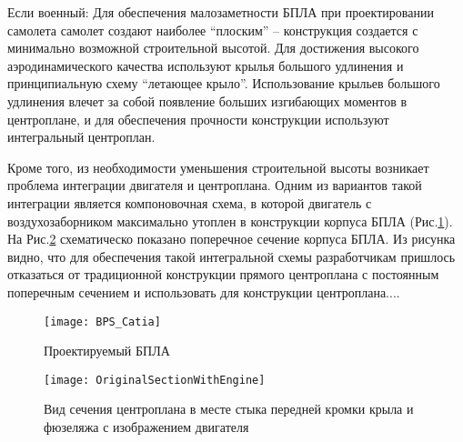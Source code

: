 


Если военный: Для обеспечения малозаметности БПЛА при проектировании самолета самолет создают наиболее ``плоским'' -- конструкция создается с минимально возможной строительной высотой. Для достижения высокого аэродинамического качества используют крылья большого удлинения и принципиальную схему ``летающее крыло''. Использование крыльев большого удлинения влечет за собой появление больших изгибающих моментов в центроплане, и для обеспечения прочности конструкции используют интегральный центроплан. 


Кроме того, из необходимости уменьшения строительной высоты возникает проблема интеграции двигателя и центроплана. Одним из вариантов такой интеграции является компоновочная схема, в которой двигатель с воздухозаборником максимально утоплен в конструкции корпуса БПЛА (Рис.\ref{fig:BPS}). На Рис.\ref{fig:OriginalSectionWithEngine} схематическо показано поперечное сечение корпуса БПЛА. Из рисунка видно, что для обеспечения такой интегральной схемы разработчикам пришлось отказаться от традиционной конструкции прямого центроплана с постоянным поперечным сечением и использовать для конструкции центроплана....



\begin{figure}[ht]
\centering
\texttt{[image: BPS\_Catia]}
\caption{Проектируемый БПЛА}
\label{fig:BPS}
\end{figure}




\begin{figure}[ht]
\captionsetup{justification=centering}
\centering
\texttt{[image: OriginalSectionWithEngine]}
\caption{Вид сечения центроплана в месте стыка передней кромки крыла и фюзеляжа с изображением двигателя}
\label{fig:OriginalSectionWithEngine}
\end{figure}


